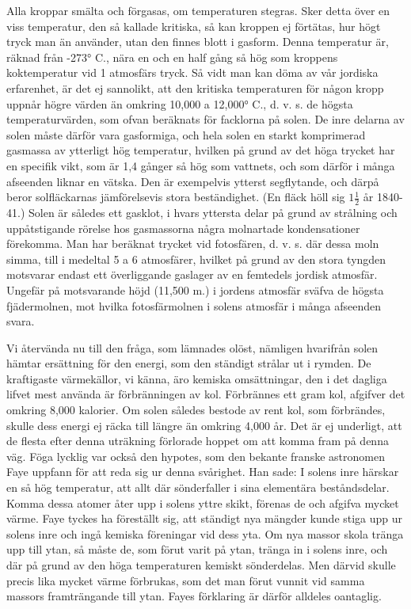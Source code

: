 \documentclass[a4paper, 12pt, oneside, swedish]{article}
\begin{document}
Alla kroppar smälta och förgasas, om temperaturen stegras. Sker detta över en viss temperatur, den så kallade kritiska, så kan kroppen ej förtätas, hur högt tryck man än använder, utan den finnes blott i gasform. Denna temperatur är, räknad från -273° C., nära en och en half gång så hög som kroppens koktemperatur vid 1 atmosfärs tryck. Så vidt man kan döma av vår jordiska erfarenhet, är det ej sannolikt, att den kritiska temperaturen för någon kropp uppnår högre värden än omkring 10,000 a 12,000° C., d. v. s. de högsta temperaturvärden, som ofvan beräknats för facklorna på solen. De inre delarna av solen måste därför vara gasformiga, och hela solen en starkt komprimerad gasmassa av ytterligt hög temperatur, hvilken på grund av det höga trycket har en specifik vikt, som är 1,4 gånger så hög som vattnets, och som därför i många afseenden liknar en vätska. Den är exempelvis ytterst segflytande, och därpå beror solfläckarnas jämförelsevis stora beständighet. (En fläck höll sig $1\frac{1}{2}$ år 1840-41.) Solen är således ett gasklot, i hvars yttersta delar på grund av strålning och uppåtstigande rörelse hos gasmassorna några molnartade kondensationer förekomma. Man har beräknat trycket vid fotosfären, d. v. s. där dessa moln simma, till i medeltal 5 a 6 atmosfärer, hvilket på grund av den stora tyngden motsvarar endast ett överliggande gaslager av en femtedels jordisk atmosfär. Ungefär på motsvarande höjd (11,500 m.) i jordens atmosfär sväfva de högsta fjädermolnen, mot hvilka fotosfärmolnen i solens atmosfär i många afseenden svara.

Vi återvända nu till den fråga, som lämnades olöst, nämligen hvarifrån solen hämtar ersättning för den energi, som den ständigt strålar ut i rymden. De kraftigaste värmekällor, vi känna, äro kemiska omsättningar, den i det dagliga lifvet mest använda är förbränningen av kol. Förbrännes ett gram kol, afgifver det omkring 8,000 kalorier. Om solen således bestode av rent kol, som förbrändes, skulle dess energi ej räcka till längre än omkring 4,000 år. Det är ej underligt, att de flesta efter denna uträkning förlorade hoppet om att komma fram på denna väg. Föga lycklig var också den hypotes, som den bekante franske astronomen Faye uppfann för att reda sig ur denna svårighet. Han sade: I solens inre härskar en så hög temperatur, att allt där sönderfaller i sina elementära beståndsdelar. Komma dessa atomer åter upp i solens yttre skikt, förenas de och afgifva mycket värme. Faye tyckes ha föreställt sig, att ständigt nya mängder kunde stiga upp ur solens inre och ingå kemiska föreningar vid dess yta. Om nya massor skola tränga upp till ytan, så måste de, som förut varit på ytan, tränga in i solens inre, och där på grund av den höga temperaturen kemiskt sönderdelas. Men därvid skulle precis lika mycket värme förbrukas, som det man förut vunnit vid samma massors framträngande till ytan. Fayes förklaring är därför alldeles oantaglig.
\end{document}
